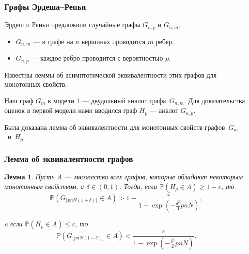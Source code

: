 \documentclass[pdf, intlimits, 12pt, unicode]{beamer} %
\newcommand{\PRob}{\mathbb P}
\newcommand{\leqs}{\leqslant}
\newcommand{\geqs}{\geqslant}
\newcommand{\eps}{\varepsilon}
\newtheorem*{lemmaa}{Лемма}
\begin{document}
\begin{frame}
	\frametitle{Графы Эрдеша--Реньи}
	Эрдеш и Реньи предложили случайные графы $G_{n, p}$ и $G_{n, m}$.
	\begin{itemize}
		\item $G_{n,m}$ --- в графе на $n$ вершинах проводится $m$ ребер.
		\item $G_{n,p}$ --- каждое ребро проводится с вероятностью $p$.
	\end{itemize}
	Известны леммы об асимптотической эквивалентности этих графов для монотонных свойств.
	
	\bigskip
	
	Наш граф $G_m$ в модели 1 --- двудольный аналог графа~$G_{n,m}$.
	Для доказательства оценок в первой модели нами вводился граф $H_p$ --- аналог $G_{n,p}$.
	
	Была доказана лемма об эквивалентности для монотонных свойств графов~$G_m$~и~$H_p$.
	
	
\end{frame}


\begin{frame}
	\frametitle{Лемма об эквивалентности графов}
	\begin{lemmaa}
		Пусть $A$ --- множество всех графов, которые обладают некоторым монотонным свойством, а $\delta \in (0,1)$.
		Тогда, если $\PRob( H_p \in A) \geqs 1 - \eps$, то
			\vspace{-3mm}
			\begin{equation*} \label{l1_1}
			\PRob(G_{\lceil pnN(1+\delta) \rceil} \in A) > 1 - \frac{\eps}{1 - \exp\left(-\frac{\delta^2}{4}pnN\right)},
			\end{equation*}
			\vspace{-7mm}
			
		a если $\PRob( H_p \in A) \leqs \eps$, то
			\vspace{-3mm}
			\begin{equation*}\label{l1_2}
			\PRob(G_{\lfloor pnN(1-\delta) \rfloor} \in A) < \frac{\eps}{1 - \exp\left(-\frac{\delta^2}{2}pnN\right)}.
			\end{equation*}
	\end{lemmaa}

\end{frame}
\end{document}
